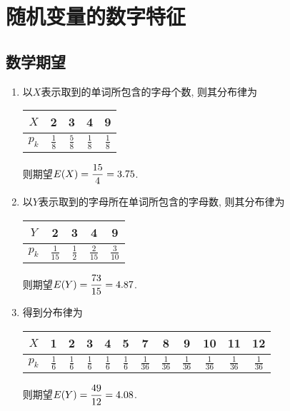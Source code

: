 \section{随机变量的数字特征}
\subsection{数学期望}
\begin{prob}
	\begin{enumerate}
	\item 
	以$X$表示取到的单词所包含的字母个数, 则其分布律为
	\begin{center}
		\begin{tabular}{c|cccc}
			\hline
			$X$&2&3&4&9\\
			\hline
			$p_k$&$\frac{1}{8}$&$\frac{5}{8}$&$\frac{1}{8}$&$\frac{1}{8}$\\
			\hline
		\end{tabular}
	\end{center}
	则期望$\displaystyle E(X)=\frac{15}{4}=3.75$.
	\item
	以$Y$表示取到的字母所在单词所包含的字母数, 则其分布律为
	\begin{center}
		\begin{tabular}{c|cccc}
			\hline
			$Y$&2&3&4&9\\
			\hline
			$p_k$&$\frac{1}{15}$&$\frac{1}{2}$&$\frac{2}{15}$&$\frac{3}{10}$\\
			\hline
		\end{tabular}
	\end{center}
	则期望$\displaystyle E(Y)=\frac{73}{15}=4.87$.
	\item
	得到分布律为
	\begin{center}
		\begin{tabular}{c|ccccccccccc}
			\hline
			$X$&1&2&3&4&5&7&8&9&10&11&12\\
			\hline
			$p_k$&$\frac{1}{6}$&$\frac{1}{6}$&$\frac{1}{6}$&$\frac{1}{6}$&$\frac{1}{6}$
			&$\frac{1}{36}$&$\frac{1}{36}$&$\frac{1}{36}$&$\frac{1}{36}$&$\frac{1}{36}$&$\frac{1}{36}$\\
			\hline
		\end{tabular}
	\end{center}
	则期望$\displaystyle E(Y)=\frac{49}{12}=4.08$.
	\end{enumerate}
\end{prob}
\setcounter{prob}{5}
